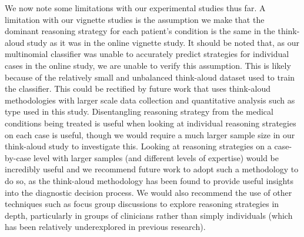 \documentclass[a4paper, nobind]{templates/ociamthesis}
\begin{document}
We now note some limitations with our experimental studies thus far. A limitation with our vignette studies is the assumption we make that the dominant reasoning strategy for each patient's condition is the same in the think-aloud study as it was in the online vignette study. It should be noted that, as our multinomial classifier was unable to accurately predict strategies for individual cases in the online study, we are unable to verify this assumption. This is likely because of the relatively small and unbalanced think-aloud dataset used to train the classifier. This could be rectified by future work that uses think-aloud methodologies with larger scale data collection and quantitative analysis such as type used in this study. Disentangling reasoning strategy from the medical conditions being treated is useful when looking at individual reasoning strategies on each case is useful, though we would require a much larger sample size in our think-aloud study to investigate this. Looking at reasoning strategies on a case-by-case level with larger samples (and different levels of expertise) would be incredibly useful and we recommend future work to adopt such a methodology to do so, as the think-aloud methodology has been found to provide useful insights into the diagnostic decision process. We would also recommend the use of other techniques such as focus group discussions to explore reasoning strategies in depth, particularly in groups of clinicians rather than simply individuals (which has been relatively underexplored in previous research).\\
\end{document}
